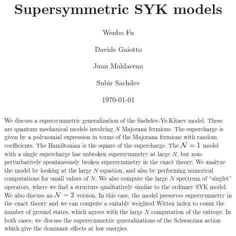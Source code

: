 \documentclass[aps,pre,preprint,onecolumn,citeautoscript,superscriptaddress,nofootinbib,eqsecnum]{revtex4-1}
\begin{document}
\title{Supersymmetric SYK models}

\author{Wenbo Fu}


\author{Davide Gaiotto}


\author{Juan Maldacena}



\author{Subir Sachdev}



\date{\today
\\
\vspace{0.4in}}

\begin{abstract}%

We discuss a supersymmetric generalization of the Sachdev-Ye-Kitaev model. These are quantum mechanical models 
involving $N$ Majorana fermions. The supercharge is given by a polynomial expression in terms of the Majorana fermions with 
random coefficients. The Hamiltonian is the square of the supercharge. 
The ${\cal N}=1$ model with a single supercharge has unbroken supersymmetry at large $N$, but non-perturbatively 
spontaneously broken supersymmetry 
in the exact theory. We analyze the model by looking at the large $N$ equation, and also by performing numerical computations for small values of $N$. 
We also compute the large $N$ spectrum of ``singlet'' operators, where we find a structure qualitatively similar to the ordinary SYK model. 
 We also discuss an ${\cal N}=2$ version. In this case, the model preserves supersymmetry in the exact theory and we can compute a 
 suitably weighted Witten index to count the number of ground states, which agrees with the large $N$ computation of  the entropy. 
 In both cases, we discuss the supersymmetric generalizations of the Schwarzian action which give the dominant effects at low energies. 
 
\end{abstract}


\maketitle
\end{document}
